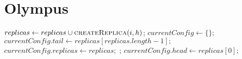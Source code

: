 \section{Olympus}

\begin{algorithmic}[1]
		\State $replicas\gets replicas \cup \Call{createReplica}{i, h}$;
    \State $currentConfig\gets \{\};$
    \State $currentConfig.tail\gets replicas[replicas.length - 1];$
    \State $currentConfig.replicas\gets replicas;$
    \EndFor
    \State {};
    \State $currentConfig.head\gets replicas[0];$
\EndFunction
\end{algorithmic}
